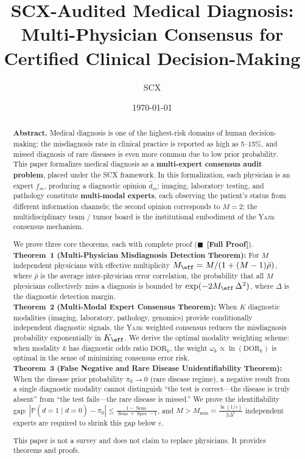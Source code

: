 \documentclass[11pt,a4paper]{article}
\title{\textbf{SCX-Audited Medical Diagnosis:}\\[4pt]
\large Multi-Physician Consensus for Certified Clinical Decision-Making}
\author{SCX}
\date{\today}
\theoremstyle{definition}
\newcommand{\rigorFull}[0]{$\blacksquare$~\textbf{[Full Proof]}}
\newcommand{\Yajie}{\textsc{Yajie}}
\newcommand{\SCX}{\textsc{SCX}}
\DeclareMathOperator{\Sens}{Sens}
\DeclareMathOperator{\Spec}{Spec}
\newcommand{\Pbb}{\mathbb{P}}
\newcommand{\abs}[1]{\left|#1\right|}
\newcommand{\disease}{d}                       %
\newcommand{\diagnosis}{\hat{d}}               %
\begin{document}
\maketitle

\begin{abstract}
\noindent
{\bf Abstract.} Medical diagnosis is one of the highest-risk domains of human decision-making: the misdiagnosis rate in clinical practice
is reported as high as 5--15\%, and missed diagnosis of rare diseases is even more common due to low prior probability.
This paper formalizes medical diagnosis as a {\bf multi-expert consensus audit problem}, placed under the \SCX{} framework.
In this formalization, each physician is an expert $f_m$, producing a diagnostic opinion $\diagnosis_m$;
imaging, laboratory testing, and pathology constitute {\bf multi-modal experts},
each observing the patient's status from different information channels;
the second opinion corresponds to $M=2$;
the multidisciplinary team / tumor board is the institutional embodiment of the \Yajie{} consensus mechanism.

We prove three core theorems, each with complete proof (\rigorFull).\\
{\bf Theorem~1 (Multi-Physician Misdiagnosis Detection Theorem):}
For $M$ independent physicians with effective multiplicity $M_{\eff} = M/(1+(M-1)\bar{\rho})$,
where $\bar{\rho}$ is the average inter-physician error correlation, the probability that all $M$ physicians collectively miss a diagnosis is bounded by
$\exp(-2M_{\eff}\,\Delta^2)$, where $\Delta$ is the diagnostic detection margin.\\
{\bf Theorem~2 (Multi-Modal Expert Consensus Theorem):}
When $K$ diagnostic modalities (imaging, laboratory, pathology, genomics) provide conditionally independent diagnostic signals,
the \Yajie{} weighted consensus reduces the misdiagnosis probability exponentially in $K_{\eff}$.
We derive the optimal modality weighting scheme: when modality $k$ has diagnostic odds ratio
$\text{DOR}_k$, the weight $\omega_k \propto \ln(\text{DOR}_k)$ is optimal in the sense of minimizing consensus error risk.\\
{\bf Theorem~3 (False Negative and Rare Disease Unidentifiability Theorem):}
When the disease prior probability $\pi_0 \to 0$ (rare disease regime), a negative result from a single diagnostic modality cannot distinguish
``the test is correct---the disease is truly absent'' from ``the test fails---the rare disease is missed.''
We prove the identifiability gap: $\abs{\Pbb(\disease=1 \mid \diagnosis=0) - \pi_0}
\leq \frac{1 - \Sens}{\Sens + \Spec - 1}$, and $M > M_{\min} =
\frac{\ln(1/\varepsilon)}{2\Delta^2}$ independent experts are required to shrink this gap below $\varepsilon$.

This paper is not a survey and does not claim to replace physicians. It provides theorems and proofs.
\end{abstract}
\end{document}
